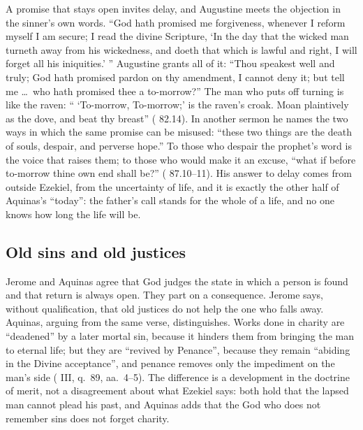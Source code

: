 A promise that stays open invites delay, and Augustine meets the objection in
the sinner's own words. ``God hath promised me forgiveness, whenever I reform
myself I am secure; I read the divine Scripture, `In the day that the wicked
man turneth away from his wickedness, and doeth that which is lawful and right,
I will forget all his iniquities.' '' Augustine grants all of it: ``Thou
speakest well and truly; God hath promised pardon on thy amendment, I cannot
deny it; but tell me \ldots\ who hath promised thee a to-morrow?'' The man who
puts off turning is like the raven: `` `To-morrow, To-morrow;' is the raven's
croak. Moan plaintively as the dove, and beat thy breast'' ( 82.14).
In another sermon he names the two ways in which the same promise can be
misused: ``these two things are the death of souls, despair, and perverse
hope.'' To those who despair the prophet's word is the voice that raises them;
to those who would make it an excuse, ``what if before to-morrow thine own end
shall be?'' ( 87.10--11). His answer to delay comes from outside
Ezekiel, from the uncertainty of life, and it is exactly the other half of
Aquinas's ``today'': the father's call stands for the whole of a life, and no
one knows how long the life will be.

\subsection{Old sins and old justices}

Jerome and Aquinas agree that God judges the state in which a person is found
and that return is always open. They part on a consequence. Jerome says,
without qualification, that old justices do not help the one who falls away.
Aquinas, arguing from the same verse, distinguishes. Works done in charity are
``deadened'' by a later mortal sin, because it hinders them from bringing the
man to eternal life; but they are ``revived by Penance'', because they remain
``abiding in the Divine acceptance'', and penance removes only the impediment on
the man's side ( III, q.~89, aa.~4--5). The difference
is a development in the doctrine of merit, not a disagreement about what Ezekiel
says: both hold that the lapsed man cannot plead his past, and Aquinas adds
that the God who does not remember sins does not forget charity.

